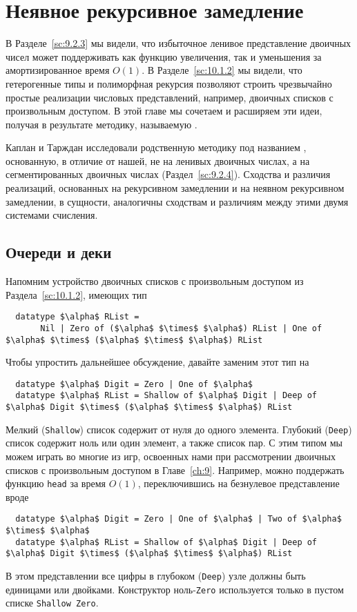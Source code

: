 \chapter{Неявное рекурсивное замедление}
\label{ch:11}

В Разделе~\ref{sc:9.2.3} мы видели, что избыточное ленивое
представление двоичных чисел может поддерживать как функцию
увеличения, так и уменьшения за амортизированное время $O(1)$. В
Разделе~\ref{sc:10.1.2} мы видели, что гетерогенные типы и полиморфная
рекурсия позволяют строить чрезвычайно простые реализации числовых
представлений, например, двоичных списков с произвольным доступом. В
этой главе мы сочетаем и расширяем эти идеи, получая в результате
методику, называемую .

Каплан и Тарждан \cite{KaplanTarjan1995, KaplanTarjan1996b,
  KaplanTarjan1996a} исследовали родственную методику под названием
, основанную, в
отличие от нашей, не на ленивых двоичных числах, а на сегментированных
двоичных числах (Раздел~\ref{sc:9.2.4}). Сходства и различия
реализаций, основанных на рекурсивном замедлении и на неявном
рекурсивном замедлении, в сущности, аналогичны сходствам и различиям
между этими двумя системами счисления.

\section{Очереди и деки}
\label{sc:11.1}

Напомним устройство двоичных списков с произвольным доступом из
Раздела~\ref{sc:10.1.2}, имеющих тип
\begin{lstlisting}
  datatype $\alpha$ RList =
       Nil | Zero of ($\alpha$ $\times$ $\alpha$) RList | One of $\alpha$ $\times$ ($\alpha$ $\times$ $\alpha$) RList
\end{lstlisting}
Чтобы упростить дальнейшее обсуждение, давайте заменим этот тип на
\begin{lstlisting}
  datatype $\alpha$ Digit = Zero | One of $\alpha$
  datatype $\alpha$ RList = Shallow of $\alpha$ Digit | Deep of $\alpha$ Digit $\times$ ($\alpha$ $\times$ $\alpha$) RList
\end{lstlisting}
Мелкий (\lstinline!Shallow!) список содержит от нуля до одного
элемента. Глубокий (\lstinline!Deep!) список содержит ноль или один
элемент, а также список пар. С этим типом мы можем играть во многие из
игр, освоенных нами при рассмотрении двоичных списков с произвольным
доступом в Главе~\ref{ch:9}. Например, можно поддержать функцию
\lstinline!head! за время $O(1)$, переключившись на безнулевое
представление вроде
\begin{lstlisting}
  datatype $\alpha$ Digit = Zero | One of $\alpha$ | Two of $\alpha$ $\times$ $\alpha$
  datatype $\alpha$ RList = Shallow of $\alpha$ Digit | Deep of $\alpha$ Digit $\times$ ($\alpha$ $\times$ $\alpha$) RList
\end{lstlisting}
В этом представлении все цифры в глубоком (\lstinline!Deep!) узле
должны быть единицами или двойками. Конструктор ноль-\lstinline!Zero!
используется только в пустом списке \lstinline!Shallow Zero!.

